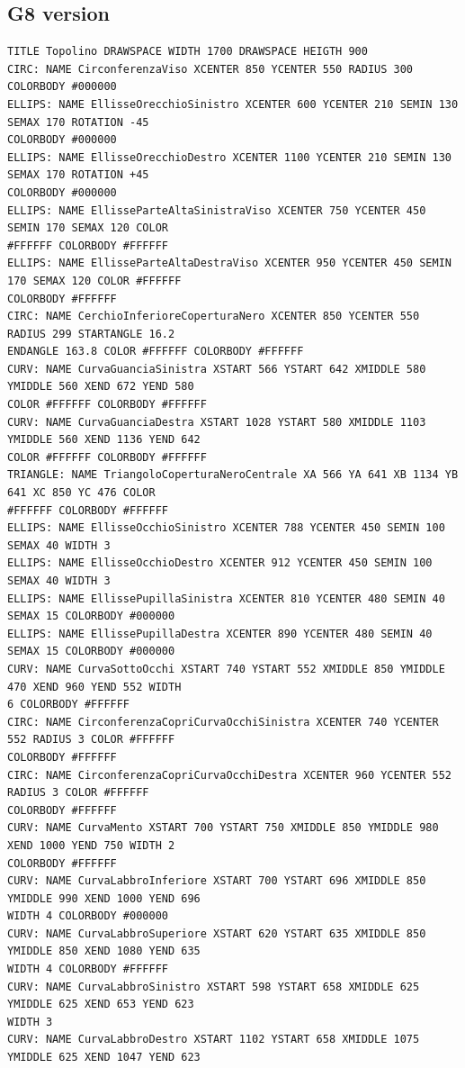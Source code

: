 \documentclass[a4paper]{article}
\begin{document}
\subsection{G8 version}
\begin{verbatim}
TITLE Topolino DRAWSPACE WIDTH 1700 DRAWSPACE HEIGTH 900
CIRC: NAME CirconferenzaViso XCENTER 850 YCENTER 550 RADIUS 300 COLORBODY #000000
ELLIPS: NAME EllisseOrecchioSinistro XCENTER 600 YCENTER 210 SEMIN 130 SEMAX 170 ROTATION -45
COLORBODY #000000
ELLIPS: NAME EllisseOrecchioDestro XCENTER 1100 YCENTER 210 SEMIN 130 SEMAX 170 ROTATION +45
COLORBODY #000000
ELLIPS: NAME EllisseParteAltaSinistraViso XCENTER 750 YCENTER 450 SEMIN 170 SEMAX 120 COLOR
#FFFFFF COLORBODY #FFFFFF
ELLIPS: NAME EllisseParteAltaDestraViso XCENTER 950 YCENTER 450 SEMIN 170 SEMAX 120 COLOR #FFFFFF
COLORBODY #FFFFFF
CIRC: NAME CerchioInferioreCoperturaNero XCENTER 850 YCENTER 550 RADIUS 299 STARTANGLE 16.2
ENDANGLE 163.8 COLOR #FFFFFF COLORBODY #FFFFFF
CURV: NAME CurvaGuanciaSinistra XSTART 566 YSTART 642 XMIDDLE 580 YMIDDLE 560 XEND 672 YEND 580
COLOR #FFFFFF COLORBODY #FFFFFF
CURV: NAME CurvaGuanciaDestra XSTART 1028 YSTART 580 XMIDDLE 1103 YMIDDLE 560 XEND 1136 YEND 642
COLOR #FFFFFF COLORBODY #FFFFFF
TRIANGLE: NAME TriangoloCoperturaNeroCentrale XA 566 YA 641 XB 1134 YB 641 XC 850 YC 476 COLOR
#FFFFFF COLORBODY #FFFFFF
ELLIPS: NAME EllisseOcchioSinistro XCENTER 788 YCENTER 450 SEMIN 100 SEMAX 40 WIDTH 3
ELLIPS: NAME EllisseOcchioDestro XCENTER 912 YCENTER 450 SEMIN 100 SEMAX 40 WIDTH 3
ELLIPS: NAME EllissePupillaSinistra XCENTER 810 YCENTER 480 SEMIN 40 SEMAX 15 COLORBODY #000000
ELLIPS: NAME EllissePupillaDestra XCENTER 890 YCENTER 480 SEMIN 40 SEMAX 15 COLORBODY #000000
CURV: NAME CurvaSottoOcchi XSTART 740 YSTART 552 XMIDDLE 850 YMIDDLE 470 XEND 960 YEND 552 WIDTH
6 COLORBODY #FFFFFF
CIRC: NAME CirconferenzaCopriCurvaOcchiSinistra XCENTER 740 YCENTER 552 RADIUS 3 COLOR #FFFFFF
COLORBODY #FFFFFF
CIRC: NAME CirconferenzaCopriCurvaOcchiDestra XCENTER 960 YCENTER 552 RADIUS 3 COLOR #FFFFFF
COLORBODY #FFFFFF
CURV: NAME CurvaMento XSTART 700 YSTART 750 XMIDDLE 850 YMIDDLE 980 XEND 1000 YEND 750 WIDTH 2
COLORBODY #FFFFFF
CURV: NAME CurvaLabbroInferiore XSTART 700 YSTART 696 XMIDDLE 850 YMIDDLE 990 XEND 1000 YEND 696
WIDTH 4 COLORBODY #000000
CURV: NAME CurvaLabbroSuperiore XSTART 620 YSTART 635 XMIDDLE 850 YMIDDLE 850 XEND 1080 YEND 635
WIDTH 4 COLORBODY #FFFFFF
CURV: NAME CurvaLabbroSinistro XSTART 598 YSTART 658 XMIDDLE 625 YMIDDLE 625 XEND 653 YEND 623
WIDTH 3
CURV: NAME CurvaLabbroDestro XSTART 1102 YSTART 658 XMIDDLE 1075 YMIDDLE 625 XEND 1047 YEND 623

\end{verbatim}
\end{document}

